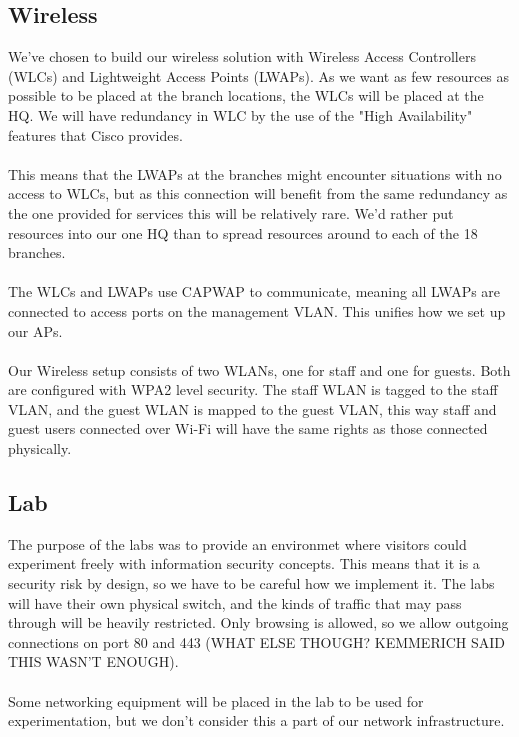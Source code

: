 \subsection{Wireless}


We've chosen to build our wireless solution with Wireless Access Controllers (WLCs) and Lightweight Access Points (LWAPs). As we want as few resources as possible to be placed at the branch locations, the WLCs will be placed at the HQ. We will have redundancy in WLC by the use of the "High Availability" features that Cisco provides.
\\
\\
This means that the LWAPs at the branches might encounter situations with no access to WLCs, but as this connection will benefit from the same redundancy as the one provided for services this will be relatively rare. We'd rather put resources into our one HQ than to spread resources around to each of the 18 branches.
\\
\\
The WLCs and LWAPs use CAPWAP to communicate, meaning all LWAPs are connected to access ports on the management VLAN. This unifies how we set up our APs.
\\
\\
Our Wireless setup consists of two WLANs, one for staff and one for guests. Both are configured with WPA2 level security. The staff WLAN is tagged to the staff VLAN, and the guest WLAN is mapped to the guest VLAN, this way staff and guest users connected over Wi-Fi will have the same rights as those connected physically.

\subsection{Lab}


The purpose of the labs was to provide an environmet where visitors could experiment freely with information security concepts. This means that it is a security risk by design, so we have to be careful how we implement it. The labs will have their own physical switch, and the kinds of traffic that may pass through will be heavily restricted. Only browsing is allowed, so we allow outgoing connections on port 80 and 443 (WHAT ELSE THOUGH? KEMMERICH SAID THIS WASN'T ENOUGH). 
\\
\\
Some networking equipment will be placed in the lab to be used for experimentation, but we don't consider this a part of our network infrastructure.

